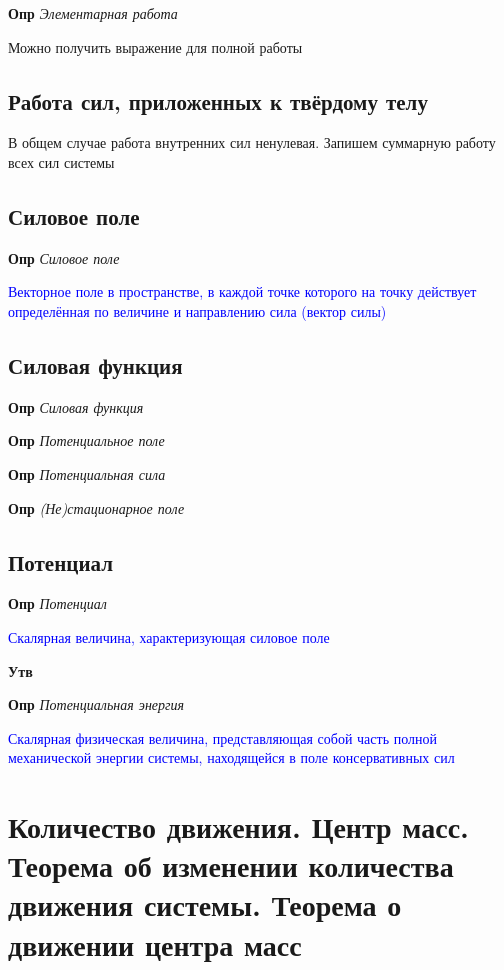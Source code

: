 \documentclass[a4paper, 14pt]{article}
\begin{document}
    \textbf{Опр} \textit{Элементарная работа}
    
    Можно получить выражение для полной работы
    
    \subsection{Работа сил, приложенных к твёрдому телу}
    
    В общем случае работа внутренних сил ненулевая.
    Запишем суммарную работу всех сил системы
    
    \subsection{Силовое поле}
    
    \textbf{Опр} \textit{Силовое поле}
    
    \textcolor{blue}{Векторное поле в пространстве, в каждой точке которого на точку действует определённая
    по величине и направлению сила (вектор силы)}
    
    \subsection{Силовая функция}
    
    \textbf{Опр} \textit{Силовая функция}
    
    \textbf{Опр} \textit{Потенциальное поле}
    
    \textbf{Опр} \textit{Потенциальная сила}
    
    \textbf{Опр} \textit{(Не)стационарное поле}
    
    \subsection{Потенциал}
    
    \textbf{Опр} \textit{Потенциал}
    
    \textcolor{blue}{Скалярная величина, характеризующая силовое поле}
    
    \textbf{Утв}
    
    \textbf{Опр} \textit{Потенциальная энергия}
    
    \textcolor{blue}{Скалярная физическая величина, представляющая собой часть полной механической
    энергии системы, находящейся в поле консервативных сил}
    
    \section{Количество движения.
    Центр масс.
    Теорема об изменении количества движения системы.
    Теорема о движении центра масс}
    
\end{document}
